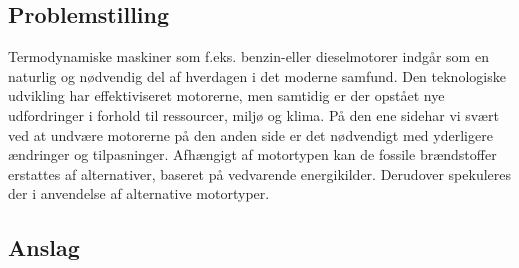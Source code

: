 \documentclass[SRC.tex]{subfiles}
\begin{document}
	\subsection*{Problemstilling}
	Termodynamiske maskiner som f.eks. benzin-eller dieselmotorer indgår som en naturlig og nødvendig del af hverdagen i det moderne samfund. Den teknologiske udvikling har effektiviseret motorerne, men samtidig er der opstået nye udfordringer i forhold til ressourcer, miljø og klima. På den ene sidehar vi svært ved at undvære motorerne på den anden side er det nødvendigt med yderligere ændringer og tilpasninger. Afhængigt af motortypen kan de fossile brændstoffer erstattes af alternativer, baseret på vedvarende energikilder.  Derudover spekuleres der i anvendelse af alternative motortyper.
	\subsection*{Anslag}
\end{document}
